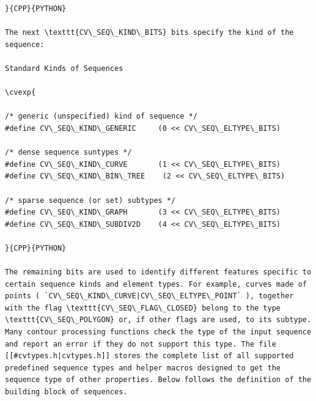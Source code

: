\begin{verbatim}
}{CPP}{PYTHON}

The next \texttt{CV\_SEQ\_KIND\_BITS} bits specify the kind of the sequence:

Standard Kinds of Sequences

\cvexp{

/* generic (unspecified) kind of sequence */
#define CV\_SEQ\_KIND\_GENERIC     (0 << CV\_SEQ\_ELTYPE\_BITS)

/* dense sequence suntypes */
#define CV\_SEQ\_KIND\_CURVE       (1 << CV\_SEQ\_ELTYPE\_BITS)
#define CV\_SEQ\_KIND\_BIN\_TREE    (2 << CV\_SEQ\_ELTYPE\_BITS)

/* sparse sequence (or set) subtypes */
#define CV\_SEQ\_KIND\_GRAPH       (3 << CV\_SEQ\_ELTYPE\_BITS)
#define CV\_SEQ\_KIND\_SUBDIV2D    (4 << CV\_SEQ\_ELTYPE\_BITS)

}{CPP}{PYTHON}

The remaining bits are used to identify different features specific to certain sequence kinds and element types. For example, curves made of points ( `CV\_SEQ\_KIND\_CURVE|CV\_SEQ\_ELTYPE\_POINT` ), together with the flag \texttt{CV\_SEQ\_FLAG\_CLOSED} belong to the type \texttt{CV\_SEQ\_POLYGON} or, if other flags are used, to its subtype. Many contour processing functions check the type of the input sequence and report an error if they do not support this type. The file [[#cvtypes.h|cvtypes.h]] stores the complete list of all supported predefined sequence types and helper macros designed to get the sequence type of other properties. Below follows the definition of the building block of sequences.


\end{verbatim}
\label{CvSeqBlock}
